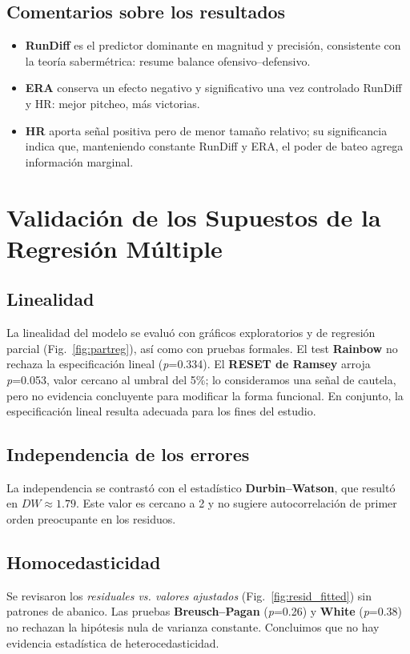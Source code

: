 \documentclass[man,floatsintext]{apa7}
\begin{document}
\subsection{Comentarios sobre los resultados}
\begin{itemize}
    \item \textbf{RunDiff} es el predictor dominante en magnitud y precisión, consistente con la teoría sabermétrica: resume balance ofensivo--defensivo.
    \item \textbf{ERA} conserva un efecto negativo y significativo una vez controlado RunDiff y HR: mejor pitcheo, más victorias.
    \item \textbf{HR} aporta señal positiva pero de menor tamaño relativo; su significancia indica que, manteniendo constante RunDiff y ERA, el poder de bateo agrega información marginal.
\end{itemize}
\section{Validación de los Supuestos de la Regresión Múltiple}
%
\subsection{Linealidad}
La linealidad del modelo se evaluó con gráficos exploratorios y de regresión parcial (Fig.~\ref{fig:partreg}), así como con pruebas formales. El test \textbf{Rainbow} no rechaza la especificación lineal (\emph{p}=0.334). El \textbf{RESET de Ramsey} arroja \emph{p}=0.053, valor cercano al umbral del 5\%; lo consideramos una señal de cautela, pero no evidencia concluyente para modificar la forma funcional. En conjunto, la especificación lineal resulta adecuada para los fines del estudio.

\subsection{Independencia de los errores}
La independencia se contrastó con el estadístico \textbf{Durbin--Watson}, que resultó en \(DW\approx1.79\). Este valor es cercano a 2 y no sugiere autocorrelación de primer orden preocupante en los residuos.

\subsection{Homocedasticidad}
Se revisaron los \emph{residuales vs. valores ajustados} (Fig.~\ref{fig:resid_fitted}) sin patrones de abanico. Las pruebas \textbf{Breusch--Pagan} (\emph{p}=0.26) y \textbf{White} (\emph{p}=0.38) no rechazan la hipótesis nula de varianza constante. Concluimos que no hay evidencia estadística de heterocedasticidad.
\end{document}
